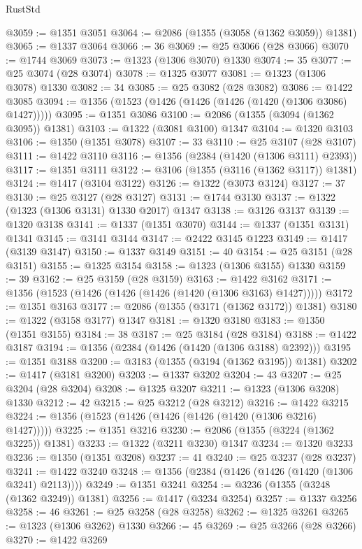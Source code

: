 \begin{lexlean}{RustStd}
\begin{coremodule}
@3059 := @1351 @3051
@3064 := @2086 (@1355 (@3058 (@1362 @3059)) @1381)
@3065 := @1337 @3064
@3066 := 36
@3069 := @25 @3066 (@28 @3066)
@3070 := @1744 @3069
@3073 := @1323 (@1306 @3070) @1330
@3074 := 35
@3077 := @25 @3074 (@28 @3074)
@3078 := @1325 @3077
@3081 := @1323 (@1306 @3078) @1330
@3082 := 34
@3085 := @25 @3082 (@28 @3082)
@3086 := @1422 @3085
@3094 := @1356 (@1523 (@1426 (@1426 (@1426 (@1420 (@1306 @3086) @1427)))))
@3095 := @1351 @3086
@3100 := @2086 (@1355 (@3094 (@1362 @3095)) @1381)
@3103 := @1322 (@3081 @3100) @1347
@3104 := @1320 @3103
@3106 := @1350 (@1351 @3078)
@3107 := 33
@3110 := @25 @3107 (@28 @3107)
@3111 := @1422 @3110
@3116 := @1356 (@2384 (@1420 (@1306 @3111) @2393))
@3117 := @1351 @3111
@3122 := @3106 (@1355 (@3116 (@1362 @3117)) @1381)
@3124 := @1417 (@3104 @3122)
@3126 := @1322 (@3073 @3124)
@3127 := 37
@3130 := @25 @3127 (@28 @3127)
@3131 := @1744 @3130
@3137 := @1322 (@1323 (@1306 @3131) @1330 @2017) @1347
@3138 := @3126 @3137
@3139 := @1320 @3138
@3141 := @1337 (@1351 @3070)
@3144 := @1337 (@1351 @3131) @1341
@3145 := @3141 @3144
@3147 := @2422 @3145 @1223
@3149 := @1417 (@3139 @3147)
@3150 := @1337 @3149
@3151 := 40
@3154 := @25 @3151 (@28 @3151)
@3155 := @1325 @3154
@3158 := @1323 (@1306 @3155) @1330
@3159 := 39
@3162 := @25 @3159 (@28 @3159)
@3163 := @1422 @3162
@3171 := @1356 (@1523 (@1426 (@1426 (@1426 (@1420 (@1306 @3163) @1427)))))
@3172 := @1351 @3163
@3177 := @2086 (@1355 (@3171 (@1362 @3172)) @1381)
@3180 := @1322 (@3158 @3177) @1347
@3181 := @1320 @3180
@3183 := @1350 (@1351 @3155)
@3184 := 38
@3187 := @25 @3184 (@28 @3184)
@3188 := @1422 @3187
@3194 := @1356 (@2384 (@1426 (@1420 (@1306 @3188) @2392)))
@3195 := @1351 @3188
@3200 := @3183 (@1355 (@3194 (@1362 @3195)) @1381)
@3202 := @1417 (@3181 @3200)
@3203 := @1337 @3202
@3204 := 43
@3207 := @25 @3204 (@28 @3204)
@3208 := @1325 @3207
@3211 := @1323 (@1306 @3208) @1330
@3212 := 42
@3215 := @25 @3212 (@28 @3212)
@3216 := @1422 @3215
@3224 := @1356 (@1523 (@1426 (@1426 (@1426 (@1420 (@1306 @3216) @1427)))))
@3225 := @1351 @3216
@3230 := @2086 (@1355 (@3224 (@1362 @3225)) @1381)
@3233 := @1322 (@3211 @3230) @1347
@3234 := @1320 @3233
@3236 := @1350 (@1351 @3208)
@3237 := 41
@3240 := @25 @3237 (@28 @3237)
@3241 := @1422 @3240
@3248 := @1356 (@2384 (@1426 (@1426 (@1420 (@1306 @3241) @2113))))
@3249 := @1351 @3241
@3254 := @3236 (@1355 (@3248 (@1362 @3249)) @1381)
@3256 := @1417 (@3234 @3254)
@3257 := @1337 @3256
@3258 := 46
@3261 := @25 @3258 (@28 @3258)
@3262 := @1325 @3261
@3265 := @1323 (@1306 @3262) @1330
@3266 := 45
@3269 := @25 @3266 (@28 @3266)
@3270 := @1422 @3269

\end{coremodule}
\end{lexlean}

